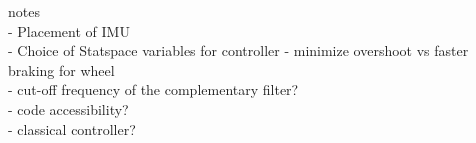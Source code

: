 {\Large notes} \\
- Placement of IMU\\
- Choice of Statspace variables for controller - minimize overshoot vs faster braking for wheel\\
- cut-off frequency of the complementary filter?\\
- code accessibility?\\
- classical controller?\\



